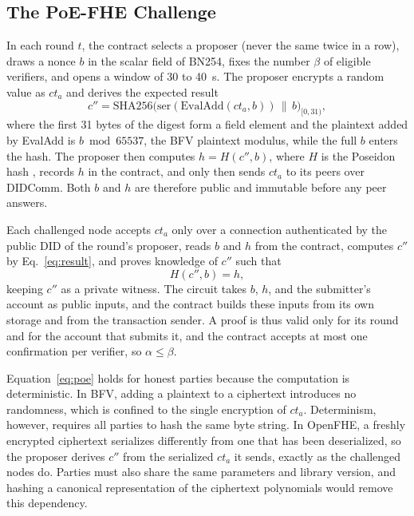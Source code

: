 \documentclass[conference]{IEEEtran}
\begin{document}
\subsection{The PoE-FHE Challenge}\label{sec:poe}
In each round $t$, the contract selects a proposer (never the same twice in a row), draws a nonce $b$ in the scalar field of BN254, fixes the number $\beta$ of eligible verifiers, and opens a window of 30 to 40~s. The proposer encrypts a random value as $\mathit{ct}_a$ and derives the expected result
\begin{equation}\label{eq:result}
  c'' = \mathrm{SHA256}\big(\mathrm{ser}(\mathrm{EvalAdd}(\mathit{ct}_a, b)) \,\|\, b\big)_{[0,31)},
\end{equation}
where the first 31 bytes of the digest form a field element and the plaintext added by EvalAdd is $b \bmod 65537$, the BFV plaintext modulus, while the full $b$ enters the hash. The proposer then computes $h = H(c'', b)$, where $H$ is the Poseidon hash \cite{grassi2021poseidon}, records $h$ in the contract, and only then sends $\mathit{ct}_a$ to its peers over DIDComm. Both $b$ and $h$ are therefore public and immutable before any peer answers.

Each challenged node accepts $\mathit{ct}_a$ only over a connection authenticated by the public DID of the round's proposer, reads $b$ and $h$ from the contract, computes $c''$ by Eq.~\eqref{eq:result}, and proves knowledge of $c''$ such that
\begin{equation}\label{eq:poe}
  H(c'', b) = h,
\end{equation}
keeping $c''$ as a private witness. The circuit takes $b$, $h$, and the submitter's account as public inputs, and the contract builds these inputs from its own storage and from the transaction sender. A proof is thus valid only for its round and for the account that submits it, and the contract accepts at most one confirmation per verifier, so $\alpha \leq \beta$.

Equation~\eqref{eq:poe} holds for honest parties because the computation is deterministic. In BFV, adding a plaintext to a ciphertext introduces no randomness, which is confined to the single encryption of $\mathit{ct}_a$. Determinism, however, requires all parties to hash the same byte string. In OpenFHE, a freshly encrypted ciphertext serializes differently from one that has been deserialized, so the proposer derives $c''$ from the serialized $\mathit{ct}_a$ it sends, exactly as the challenged nodes do. Parties must also share the same parameters and library version, and hashing a canonical representation of the ciphertext polynomials would remove this dependency.
\end{document}
